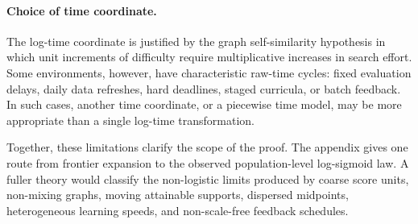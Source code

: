 \paragraph{Choice of time coordinate.}
The log-time coordinate is justified by the graph self-similarity hypothesis in which unit increments of difficulty require multiplicative increases in search effort. Some environments, however, have characteristic raw-time cycles: fixed evaluation delays, daily data refreshes, hard deadlines, staged curricula, or batch feedback. In such cases, another time coordinate, or a piecewise time model, may be more appropriate than a single log-time transformation.

Together, these limitations clarify the scope of the proof. The appendix gives one route from frontier expansion to the observed population-level log-sigmoid law. A fuller theory would classify the non-logistic limits produced by coarse score units, non-mixing graphs, moving attainable supports, dispersed midpoints, heterogeneous learning speeds, and non-scale-free feedback schedules.
